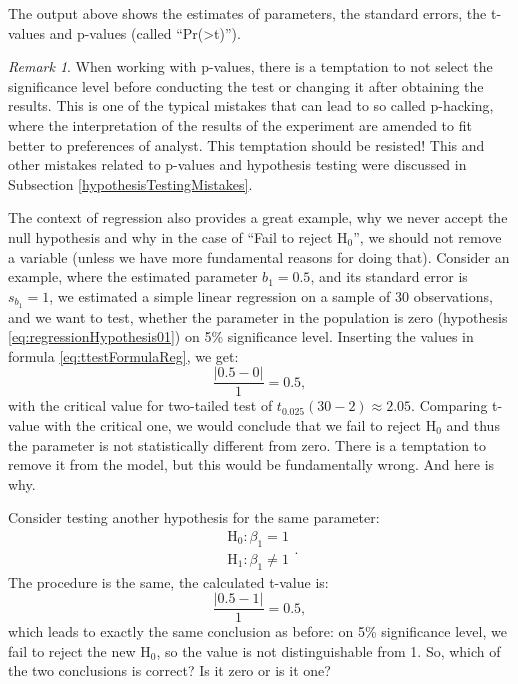 \documentclass[
]{book}
\theoremstyle{definition}
\theoremstyle{definition}
\theoremstyle{definition}
\theoremstyle{definition}
\theoremstyle{remark}
\newtheorem*{remark}{Remark}
\begin{document}
The output above shows the estimates of parameters, the standard errors, the t-values and p-values (called ``Pr(\textgreater\textbar t\textbar)'').

\begin{remark}
When working with p-values, there is a temptation to not select the significance level before conducting the test or changing it after obtaining the results. This is one of the typical mistakes that can lead to so called p-hacking, where the interpretation of the results of the experiment are amended to fit better to preferences of analyst. This temptation should be resisted! This and other mistakes related to p-values and hypothesis testing were discussed in Subsection \ref{hypothesisTestingMistakes}.
\end{remark}

The context of regression also provides a great example, why we never accept the null hypothesis and why in the case of ``Fail to reject H\(_0\)'', we should not remove a variable (unless we have more fundamental reasons for doing that). Consider an example, where the estimated parameter \(b_1=0.5\), and its standard error is \(s_{b_1}=1\), we estimated a simple linear regression on a sample of 30 observations, and we want to test, whether the parameter in the population is zero (hypothesis \eqref{eq:regressionHypothesis01}) on 5\% significance level. Inserting the values in formula \eqref{eq:ttestFormulaReg}, we get:
\begin{equation*}
\frac{|0.5 - 0|}{1} = 0.5,
\end{equation*}
with the critical value for two-tailed test of \(t_{0.025}(30-2)\approx 2.05\). Comparing t-value with the critical one, we would conclude that we fail to reject H\(_0\) and thus the parameter is not statistically different from zero. There is a temptation to remove it from the model, but this would be fundamentally wrong. And here is why.

Consider testing another hypothesis for the same parameter:
\begin{equation*}
\begin{aligned}
\mathrm{H}_0: \beta_1 = 1 \\
\mathrm{H}_1: \beta_1 \neq 1
\end{aligned} .
\end{equation*}
The procedure is the same, the calculated t-value is:
\begin{equation*}
\frac{|0.5 - 1|}{1} = 0.5,
\end{equation*}
which leads to exactly the same conclusion as before: on 5\% significance level, we fail to reject the new H\(_0\), so the value is not distinguishable from 1. So, which of the two conclusions is correct? Is it zero or is it one?
\end{document}
